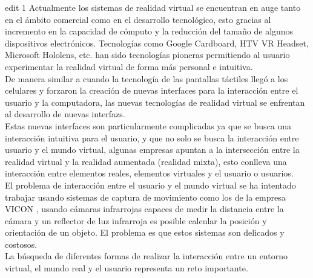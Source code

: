 edit 1 Actualmente los sistemas de \gls{realidad virtual} se encuentran en auge tanto en el ámbito comercial como en el desarrollo tecnológico, esto gracias al incremento en la capacidad de cómputo y la reducción del tamaño de algunos dispositivos electrónicos. Tecnologías como Google Cardboard, HTV VR Headset, Microsoft Hololens, etc. han sido tecnologías pioneras permitiendo al usuario experimentar la realidad virtual de forma más personal e intuitiva.\\

De manera similar a cuando la tecnología de las pantallas táctiles llegó a los celulares y forzaron la creación de nuevas interfaces para la interacción entre el usuario y la computadora, las nuevas tecnologías de realidad virtual se enfrentan al desarrollo de nuevas \glspl{interfaz}.\\

Estas nuevas interfaces son particularmente complicadas ya que se busca una interacción intuitiva para el usuario, y que no solo se busca la interacción entre usuario y el mundo virtual, algunas empresas apuntan a la intersección entre la realidad virtual y la realidad aumentada (realidad mixta), esto conlleva una interacción entre elementos reales, elementos virtuales y el usuario o usuarios.\\

El problema de interacción entre el usuario y el mundo virtual se ha intentado trabajar usando sistemas de captura de movimiento como los de la empresa VICON \cite{vicon}, usando cámaras infrarrojas capaces de medir la distancia entre la cámara y un reflector de luz infrarroja es posible calcular la posición y orientación de un objeto. El problema es que estos sistemas son delicados y costosos.\\

La búsqueda de diferentes formas de realizar la interacción entre un entorno virtual, el mundo real y el usuario representa un reto importante.\\



